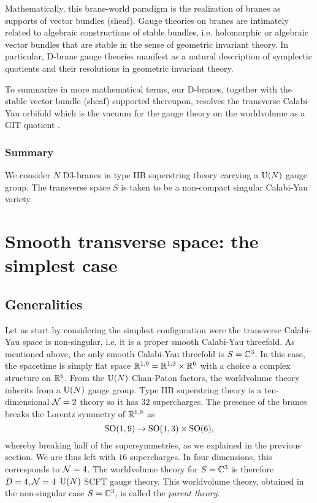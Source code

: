         Mathematically, this brane-world paradigm is the realization of branes as supports of vector bundles (sheaf). Gauge theories on branes are intimately related to algebraic constructions of stable bundles, i.e. holomorphic or algebraic vector bundles that are stable in the sense of geometric invariant theory. In particular, D-brane gauge theories manifest as a natural description of symplectic quotients and their resolutions in geometric invariant theory.

        To summarize in more mathematical terms, our D-branes, together with the stable vector bundle (sheaf) supported thereupon, resolves the transverse Calabi-Yau orbifold which is the vacuum for the gauge theory on the worldvolume as a GIT quotient \marker.

    \subsubsection*{Summary}

        We consider $N$ D$3$-branes in type IIB superstring theory carrying a $\text{U}(N)$ gauge group. The transverse space $S$ is taken to be a non-compact singular Calabi-Yau variety.

\section{Smooth transverse space: the simplest case}

    \subsection{Generalities}

        Let us start by considering the simplest configuration were the transverse Calabi-Yau space is non-singular, i.e. it is a proper smooth Calabi-Yau threefold. As mentioned above, the only smooth Calabi-Yau threefold is $S=\mathbb{C}^3$. In this case, the spacetime is simply flat space $\mathbb{R}^{1,9}=\mathbb{R}^{1,3}\times\mathbb{R}^6$ with a choice a complex structure on $\mathbb{R}^6$. From the $\text{U}(N)$ Chan-Paton factors, the worldvolume theory inherits from a $\text{U}(N)$ gauge group. Type IIB superstring theory is a ten-dimensional $\mathcal{N}=2$ theory so it has $32$ supercharges. The presence of the branes breaks the Lorentz symmetry of $\mathbb{R}^{1,9}$ as
        \begin{equation}
            \text{SO}(1,9)\to\text{SO}(1,3)\times\text{SO}(6),
        \end{equation}
        whereby breaking half of the supersymmetries, as we explained in the previous section. We are thus left with $16$ supercharges. In four dimensions, this corresponds to $\mathcal{N}=4$. The worldvolume theory for $S=\mathbb{C}^3$ is therefore $D=4,\mathcal{N}=4$ $\text{U}(N)$ SCFT gauge theory. This worldvolume theory, obtained in the non-singular case $S=\mathbb{C}^3$, is called the \emph{parent theory}.

